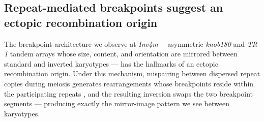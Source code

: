 \documentclass[9pt,twocolumn,twoside]{rilabRxiv}
\newcommand{\invfour}{\textit{Inv4m}\xspace}
\begin{document}

\subsection*{Repeat-mediated breakpoints suggest an ectopic recombination origin}
 
The breakpoint architecture we observe at \invfour --- asymmetric \textit{knob180} and \textit{TR-1} tandem arrays whose size, content, and orientation are mirrored between standard and inverted karyotypes --- has the hallmarks of an ectopic recombination origin.
Under this mechanism, mispairing between dispersed repeat copies during meiosis generates rearrangements whose breakpoints reside within the participating repeats \citep{zhang2004, delprat2009}, and the resulting inversion swaps the two breakpoint segments --- producing exactly the mirror-image pattern we see between karyotypes.
 
\end{document}
